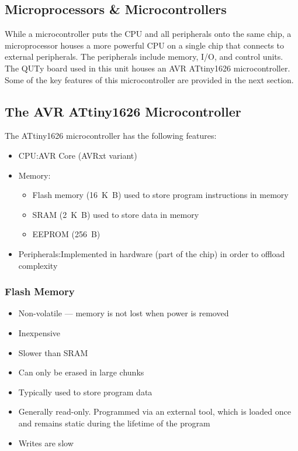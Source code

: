 \documentclass{article}
\begin{document}
\subsection{Microprocessors \& Microcontrollers}
While a microcontroller puts the CPU and all peripherals onto the same
chip, a microprocessor houses a more powerful CPU on a single chip that
connects to external peripherals. The peripherals include memory, I/O,
and control units. The QUTy board used in this unit houses an AVR
ATtiny1626 microcontroller. Some of the key features of this
microcontroller are provided in the next section.
\subsection{The AVR ATtiny1626 Microcontroller}
The ATtiny1626 microcontroller has the following features:
\begin{itemize}
    \item CPU:\@ AVR Core (AVRxt variant)
    \item Memory:
          \begin{itemize}
              \item Flash memory (\qty{16}{K.B}) used to store program
                    instructions in memory
              \item SRAM (\qty{2}{K.B}) used to store data in memory
              \item EEPROM (\qty{256}{B})
          \end{itemize}
    \item Peripherals:\@ Implemented in hardware (part of the chip) in
          order to offload complexity
\end{itemize}
\subsubsection{Flash Memory}
\begin{itemize}
    \item Non-volatile --- memory is not lost when power is removed
    \item Inexpensive
    \item Slower than SRAM
    \item Can only be erased in large chunks
    \item Typically used to store program data
    \item Generally read-only. Programmed via an external tool, which
          is loaded once and remains static during the lifetime of the
          program
    \item Writes are slow
\end{itemize}
\end{document}
